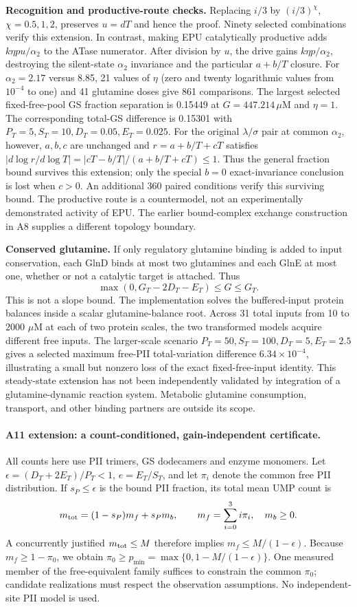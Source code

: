 \documentclass[11pt]{article}
\begin{document}
\textbf{Recognition and productive-route checks.} Replacing $i/3$ by $(i/3)^\chi$, $\chi=0.5,1,2$, preserves $u=dT$ and hence the proof. Ninety selected combinations verify this extension. In contrast, making EPU catalytically productive adds $k\eta pu/\alpha_2$ to the ATase numerator. After division by $u$, the drive gains $k\eta p/\alpha_2$, destroying the silent-state $\alpha_2$ invariance and the particular $a+b/T$ closure. For $\alpha_2=2.17$ versus 8.85, 21 values of $\eta$ (zero and twenty logarithmic values from $10^{-4}$ to one) and 41 glutamine doses give 861 comparisons. The largest selected fixed-free-pool GS fraction separation is 0.15449 at $G=447.214\,\mu$M and $\eta=1$. The corresponding total-GS difference is 0.15301 with $P_T=5,S_T=10,D_T=0.05,E_T=0.025$. For the original $\lambda/\sigma$ pair at common $\alpha_2$, however, $a,b,c$ are unchanged and $r=a+b/T+cT$ satisfies $|d\log r/d\log T|=|cT-b/T|/(a+b/T+cT)\leq1$. Thus the general fraction bound survives this extension; only the special $b=0$ exact-invariance conclusion is lost when $c>0$. An additional 360 paired conditions verify this surviving bound. The productive route is a countermodel, not an experimentally demonstrated activity of EPU. The earlier bound-complex exchange construction in A8 supplies a different topology boundary.

\textbf{Conserved glutamine.} If only regulatory glutamine binding is added to input conservation, each GlnD binds at most two glutamines and each GlnE at most one, whether or not a catalytic target is attached. Thus
\[
 \max(0,G_T-2D_T-E_T)\leq G\leq G_T.
\]
This is not a slope bound. The implementation solves the buffered-input protein balances inside a scalar glutamine-balance root. Across 31 total inputs from 10 to 2000 $\mu$M at each of two protein scales, the two transformed models acquire different free inputs. The larger-scale scenario $P_T=50,S_T=100,D_T=5,E_T=2.5$ gives a selected maximum free-PII total-variation difference $6.34\times10^{-4}$, illustrating a small but nonzero loss of the exact fixed-free-input identity. This steady-state extension has not been independently validated by integration of a glutamine-dynamic reaction system. Metabolic glutamine consumption, transport, and other binding partners are outside its scope.

\paragraph{A11 extension: a count-conditioned, gain-independent certificate.}
All counts here use PII trimers, GS dodecamers and enzyme monomers. Let $\epsilon=(D_T+2E_T)/P_T<1$, $e=E_T/S_T$, and let $\pi_i$ denote the common free PII distribution. If $s_P\leq\epsilon$ is the bound PII fraction, its total mean UMP count is
\[
 m_{\rm tot}=(1-s_P)m_f+s_Pm_b,\qquad m_f=\sum_{i=0}^3i\pi_i,\quad m_b\geq0.
\]
A concurrently justified $m_{\rm tot}\leq M$ therefore implies $m_f\leq M/(1-\epsilon)$. Because $m_f\geq1-\pi_0$, we obtain $\pi_0\geq p_{\min}=\max\{0,1-M/(1-\epsilon)\}$. One measured member of the free-equivalent family suffices to constrain the common $\pi_0$; candidate realizations must respect the observation assumptions. No independent-site PII model is used.
\end{document}
